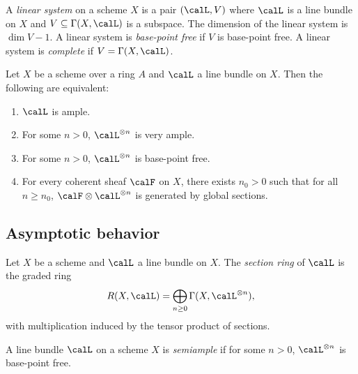     \begin{definition}\label{def:linear_system}
        A \emph{linear system} on a scheme \(X\) is a pair \((\calL,V)\) where \(\calL\) is a line bundle on \(X\) and \(V\subseteq \Gamma(X,\calL)\) is a subspace.
        The dimension of the linear system is \(\dim V - 1\).
        A linear system is \emph{base-point free} if \(V\) is base-point free.
        A linear system is \emph{complete} if \(V=\Gamma(X,\calL)\).
    \end{definition}

    \begin{theorem}\label{thm:ample_very_ample_and_bpf}
        Let \(X\) be a scheme over a ring \(A\) and \(\calL\) a line bundle on \(X\).
        Then the following are equivalent:
        \begin{enumerate}
            \item \(\calL\) is ample.
            \item For some \(n>0\), \(\calL^{\otimes n}\) is very ample.
            \item For some \(n>0\), \(\calL^{\otimes n}\) is base-point free.
            \item For every coherent sheaf \(\calF\) on \(X\), there exists \(n_0>0\) such that for all \(n\ge n_0\), \(\calF\otimes \calL^{\otimes n}\) is generated by global sections.
        \end{enumerate}
    \end{theorem}

\subsection{Asymptotic behavior}

    \begin{definition}\label{def:section_ring}
        Let \(X\) be a scheme and \(\calL\) a line bundle on \(X\).
        The \emph{section ring} of \(\calL\) is the graded ring
        \[
            R(X,\calL) = \bigoplus_{n\ge 0} \Gamma(X,\calL^{\otimes n}),
        \]
        with multiplication induced by the tensor product of sections.
        
    \end{definition}

    \begin{definition}\label{def:semiample_line_bundle}
        A line bundle \(\calL\) on a scheme \(X\) is \emph{semiample} if for some \(n>0\), \(\calL^{\otimes n}\) is base-point free.
        
    \end{definition}

